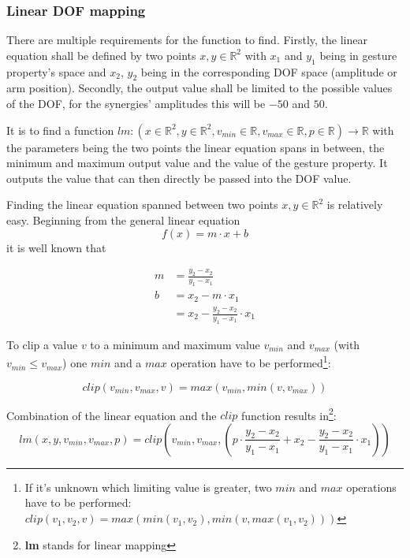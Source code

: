 \subsubsection{Linear DOF mapping}

There are multiple requirements for the function to find. Firstly, the linear equation shall be defined by two points $x, y \in \mathbb{R}^2$ with $x_1$ and $y_1$ being in gesture property's space and $x_2$, $y_2$ being in the corresponding DOF space (amplitude or arm position). Secondly, the output value shall be limited to the possible values of the DOF, for the synergies' amplitudes this will be $-50$ and $50$.

It is to find a function $lm:(x \in \mathbb{R}^2, y \in \mathbb{R}^2, v_{min} \in \mathbb{R}, v_{max} \in \mathbb{R}, p \in \mathbb{R}) \rightarrow \mathbb{R}$ with the parameters being the two points the linear equation spans in between, the minimum and maximum output value and the value of the gesture property. It outputs the value that can then directly be passed into the DOF value.

Finding the linear equation spanned between two points $x, y \in \mathbb{R}^2$ is relatively easy. Beginning from the general linear equation
\begin{equation*}
f(x) = m \cdot x + b
\end{equation*}
it is well known that

\begin{align*}
m &= \frac{y_2 - x_2}{y_1 - x_1} \\
b &= x_2 - m \cdot x_1  \\
&= x_2 - \frac{y_2 - x_2}{y_1 - x_1} \cdot x_1
\end{align*}

To clip a value $v$ to a minimum and maximum value $v_{min}$ and $v_{max}$ (with $v_{min} \leq v_{max}$) one $min$ and a $max$ operation have to be performed\footnote{If it's unknown which limiting value is greater, two $min$ and $max$ operations have to be performed: $clip(v_1, v_2, v) = max(min(v_1, v_2), min(v, max(v_1, v_2)))$}:

\begin{equation*}
clip(v_{min}, v_{max}, v) = max(v_{min}, min(v, v_{max}))
\end{equation*}

Combination of the linear equation and the $clip$ function results in\footnote{\textbf{lm} stands for linear mapping}:
\begin{equation}
\label{eq:lm}
lm(x, y, v_{min}, v_{max}, p) = clip\left(v_{min}, v_{max}, \left( p \cdot \frac{y_2 - x_2}{y_1 - x_1} + x_2 - \frac{y_2 - x_2}{y_1 - x_1} \cdot x_1 \right)\right)
\end{equation}

